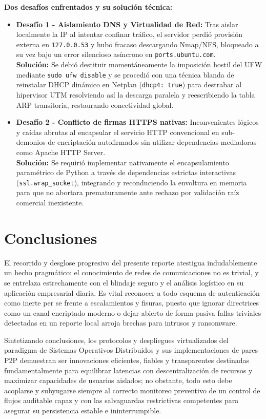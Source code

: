 \documentclass[12pt,a4paper]{report}
\begin{document}
\textbf{Dos desafíos enfrentados y su solución técnica:}
\begin{itemize}
    \item \textbf{Desafío 1 - Aislamiento DNS y Virtualidad de Red:} Tras aislar localmente la IP al intentar confinar tráfico, el servidor perdió provisión externa en \texttt{127.0.0.53} y hubo fracaso descargando Nmap/NFS, bloqueado a su vez bajo un error silencioso asíncrono en \texttt{ports.ubuntu.com}. \\ \textbf{Solución:} Se debió destituir momentáneamente la imposición hostil del UFW mediante \texttt{sudo ufw disable} y se procedió con una técnica blanda de reinstalar DHCP dinámico en Netplan (\texttt{dhcp4: true}) para destrabar al hipervisor UTM resolviendo así la descarga paralela y reescribiendo la tabla ARP transitoria, restaurando conectividad global.
    \item \textbf{Desafío 2 - Conflicto de firmas HTTPS nativas:} Inconvenientes lógicos y caídas abrutas al encapsular el servicio HTTP convencional en sub-demonios de encriptación autofirmados sin utilizar dependencias mediadoras como Apache HTTP Server. \\ \textbf{Solución:} Se requirió implementar nativamente el encapsulamiento paramétrico de Python a través de dependencias estrictas interactivas (\texttt{ssl.wrap\_socket}), integrando y reconduciendo la envoltura en memoria para que no abortara prematuramente ante rechazo por validación raíz comercial inexistente.
\end{itemize}

\chapter{Conclusiones}

El recorrido y desglose progresivo del presente reporte atestigua indudablemente un hecho pragmático: el conocimiento de redes de comunicaciones no es trivial, y se entrelaza estrechamente con el blindaje seguro y el análisis logístico en su aplicación empresarial diaria. Es vital reconocer a todo esquema de autenticación como inerte per se frente a escalamientos y fisuras, puesto que ignorar directrices como un canal encriptado moderno o dejar abierto de forma pasiva fallas triviales detectadas en un reporte local arroja brechas para intrusos y ransomware. 

Sintetizando conclusiones, los protocolos y despliegues virtualizados del paradigma de Sistemas Operativos Distribuidos y sus implementaciones de pares P2P demuestran ser innovaciones eficientes, fiables y transparentes destinadas fundamentalmente para equilibrar latencias con descentralización de recursos y maximizar capacidades de usuarios aislados; no obstante, todo esto debe acoplarse y subyugarse siempre al correcto monitoreo preventivo de un control de flujos auditable capaz y con las salvaguardas restrictivas competentes para asegurar su persistencia estable e ininterrumpible.
\end{document}
